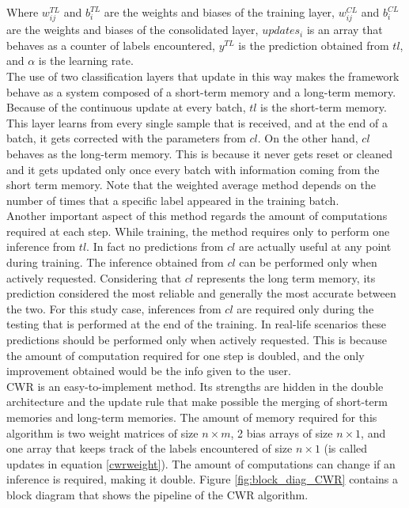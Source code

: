 \documentclass[12pt]{report}
\begin{document}
Where $w^{TL}_{ij}$ and $b^{TL}_i$ are the weights and biases of the training layer, $w^{CL}_{ij}$ and $b^{CL}_i$ are the weights and biases of the consolidated layer, $updates_{i}$ is an array that behaves as a counter of labels encountered, $y^{TL}$ is the prediction obtained from $tl$, and $\alpha$ is the learning rate.\\
The use of two classification layers that update in this way makes the framework behave as a system composed of a short-term memory and a long-term memory. Because of the continuous update at every batch, $tl$ is the short-term memory. This layer learns from every single sample that is received, and at the end of a batch, it gets corrected with the parameters from $cl$. On the other hand, $cl$ behaves as the long-term memory. This is because it never gets reset or cleaned and it gets updated only once every batch with information coming from the short term memory. Note that the weighted average method depends on the number of times that a specific label appeared in the training batch.\\
Another important aspect of this method regards the amount of computations required at each step. While training, the method requires only to perform one inference from $tl$. In fact no predictions from $cl$ are actually useful at any point during training. The inference obtained from $cl$ can be performed only when actively requested. Considering that $cl$ represents the long term memory, its prediction considered the most reliable and generally the most accurate between the two. For this study case, inferences from $cl$ are required only during the testing that is performed at the end of the training. In real-life scenarios these predictions should be performed only when actively requested. This is because the amount of computation required for one step is doubled, and the only improvement obtained would be the info given to the user.\\
CWR is an easy-to-implement method. Its strengths are hidden in the double architecture and the update rule that make possible the merging of short-term memories and long-term memories. The amount of memory required for this algorithm is two weight matrices of size $n \times m$, 2 bias arrays of size $n \times 1$, and one array that keeps track of the labels encountered of size $n \times 1$ (is called updates in equation \ref{cwrweight}). The amount of computations can change if an inference is required, making it double. Figure \ref{fig:block_diag_CWR} contains a block diagram that shows the pipeline of the CWR algorithm.
\end{document}
